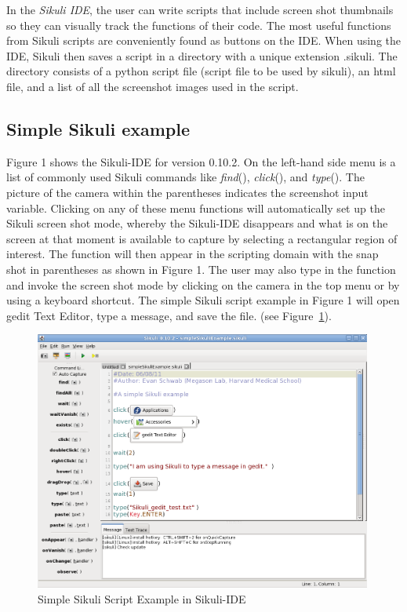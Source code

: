 \documentclass{InsightArticle}
\begin{document}
In the \emph{Sikuli IDE}, the user can write scripts that include screen shot
thumbnails so they can visually track the functions of their code. The most
useful functions from Sikuli scripts are conveniently found as
buttons on the IDE. When using the IDE, Sikuli then saves a script in a
directory with a unique extension .sikuli. The directory consists of a python
script file (script file to be used by sikuli), an html file, and a list of all
the screenshot images used in the script.


\subsection{Simple Sikuli example} %

Figure 1 shows the Sikuli-IDE for version 0.10.2.  On the left-hand side menu is a list
of commonly used Sikuli commands like  \emph{find}(),  \emph{click}(), and  \emph{type}().  The picture of
the camera within the parentheses indicates the screenshot input variable.  Clicking
on any of these menu functions will automatically set up the Sikuli screen shot mode, whereby
the Sikuli-IDE disappears and what is on the screen at that moment is available to capture 
by selecting a rectangular region of interest.  The function will then appear in the scripting domain
with the snap shot in parentheses as shown in Figure 1.  The user may also type in the function
and invoke the screen shot mode by clicking on the camera in the top menu or by using a
keyboard shortcut. The simple Sikuli script example in Figure 1 will open gedit Text Editor, type a message,
and save the file. (see Figure~\ref{fig:SimpleExample}).

\begin{figure}[htbp]
 \centering
 \includegraphics[width=0.99\textwidth]{Images/SimpleSikuliExample.png}
 \caption{Simple Sikuli Script Example in Sikuli-IDE}
 \label{fig:SimpleExample}
\end{figure}
\end{document}
